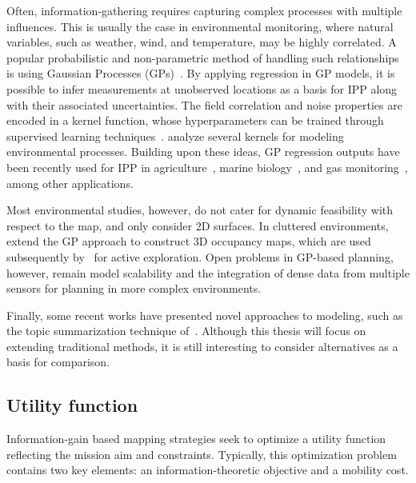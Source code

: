 Often, information-gathering requires capturing complex processes with multiple influences. This 
is usually the case in environmental monitoring, where natural variables, such as weather, 
wind, and temperature, may be highly correlated. A popular probabilistic and non-parametric method of 
handling such relationships is using Gaussian Processes (GPs)~\cite{Rasmussen2006, Hitz2015, Binney2013, 
Krause2011, Singh2009, Singh2010, Vivaldini2016}. By applying regression in GP models, it is possible to 
infer measurements at unobserved locations as a basis for IPP along with their associated uncertainties. The 
field correlation and noise properties are encoded in a kernel function, whose hyperparameters can be trained 
through supervised learning techniques~\cite{Rasmussen2006}. \citet{Singh2010} analyze several kernels 
for modeling environmental processes. Building upon these ideas, GP regression outputs have been recently 
used for IPP in agriculture~\cite{Vivaldini2016}, marine biology~\cite{Hitz2015, 
Hitz2014}, and gas monitoring~\cite{Marchant2014}, among other applications.

Most environmental studies, however, do not cater for dynamic feasibility with respect to the map, and only 
consider 2D surfaces. In cluttered environments,~\citet{OCallaghan2012} extend the GP approach to construct 
3D occupancy maps, which are used subsequently by~\citet{Yang2014} for active exploration. Open problems in 
GP-based planning, however, remain model scalability and the integration of dense data from multiple sensors 
for planning in more complex environments.

Finally, some recent works have presented novel approaches to modeling, such as the topic 
summarization technique of~\citet{Girdhar2015}. Although this thesis will focus on extending traditional 
methods, it is still interesting to consider alternatives as a basis for comparison.

\subsection{Utility function}
Information-gain based mapping strategies seek to optimize a utility function reflecting the mission 
aim and constraints. Typically, this optimization problem contains two key elements: an 
information-theoretic objective and a mobility cost.

